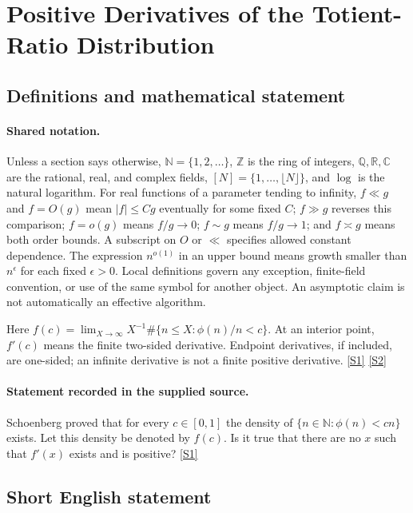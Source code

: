 \documentclass[11pt,a4paper]{article}
\newcommand{\N}{\mathbb{N}}
\newcommand{\Z}{\mathbb{Z}}
\newcommand{\Q}{\mathbb{Q}}
\newcommand{\R}{\mathbb{R}}
\newcommand{\C}{\mathbb{C}}
\newcommand{\sref}[2]{\hyperlink{source:#1:#2}{[S#2]}}
\begin{document}
\section{Positive Derivatives of the Totient-Ratio Distribution}\label{statement}


\subsection{Definitions and mathematical statement}

\paragraph{Shared notation.}Unless a section says otherwise, $\N=\{1,2,\ldots\}$,
$\Z$ is the ring of integers, $\Q,\R,\C$ are the rational, real, and complex
fields, $[N]=\{1,\ldots,\lfloor N\rfloor\}$, and $\log$ is the natural
logarithm. For real functions of a parameter tending to infinity,
$f\ll g$ and $f=O(g)$ mean $|f|\leq Cg$ eventually for some fixed $C$;
$f\gg g$ reverses this comparison; $f=o(g)$ means $f/g\to0$;
$f\sim g$ means $f/g\to1$; and $f\asymp g$ means both order bounds.
A subscript on $O$ or $\ll$ specifies allowed constant dependence.
The expression $n^{o(1)}$ in an upper bound means growth smaller than
$n^\epsilon$ for each fixed $\epsilon>0$. Local definitions govern any
exception, finite-field convention, or use of the same symbol for another
object. An asymptotic claim is not automatically an effective algorithm.



Here $f(c)=\lim_{X\to\infty}X^{-1}\#\{n\leq X:\phi(n)/n<c\}$. At an interior point, $f'(c)$ means the finite two-sided derivative. Endpoint derivatives, if included, are one-sided; an infinite derivative is not a finite positive derivative. \sref{statement}{1} \sref{statement}{2}

\paragraph{Statement recorded in the supplied source.}
Schoenberg proved that for every $c\in [0,1]$ the density of $ \{ n\in \mathbb{N} : \phi(n)<cn\} $ exists. Let this density be denoted by $f(c)$. Is it true that there are no $x$ such that $f'(x)$ exists and is positive? \sref{statement}{1}

\subsection{Short English statement}
\end{document}
